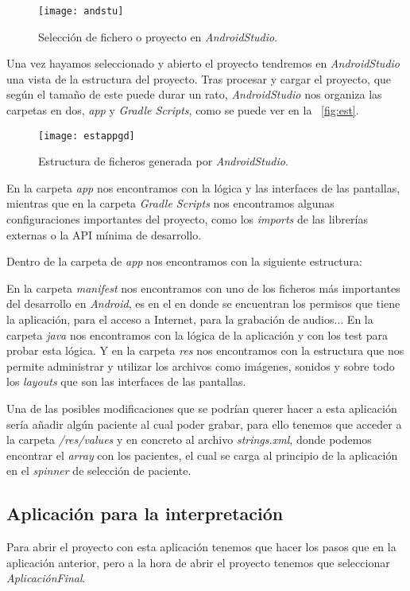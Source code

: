 \begin{figure}
	\centering
	\texttt{[image: andstu]}
	\caption{Selección de fichero o proyecto en \textit{AndroidStudio}.}
	\label{fig:andstu}
\end{figure}

Una vez hayamos seleccionado y abierto el proyecto tendremos en \textit{AndroidStudio} una vista de la estructura del proyecto. Tras procesar y cargar el proyecto, que según el tamaño de este puede durar un rato, \textit{AndroidStudio} nos organiza las carpetas en dos, \textit{app} y \textit{Gradle Scripts}, como se puede ver en la ~\ref{fig:est}.

\begin{figure}
	\centering
	\texttt{[image: estappgd]}
	\caption{Estructura de ficheros generada por \textit{AndroidStudio}.}
	\label{fig:estappgd}
\end{figure}

En la carpeta \textit{app} nos encontramos con la lógica y las interfaces de las pantallas, mientras que en la carpeta \textit{Gradle Scripts} nos encontramos algunas configuraciones importantes del proyecto, como los \textit{imports} de las librerías externas o la API mínima de desarrollo.

Dentro de la carpeta de \textit{app} nos encontramos con la siguiente estructura:

En la carpeta \textit{manifest} nos encontramos con uno de los ficheros más importantes del desarrollo en \textit{Android}, es en el en donde se encuentran los permisos que tiene la aplicación, para el acceso a Internet, para la grabación de audios... En la carpeta \textit{java} nos encontramos con la lógica de la aplicación y con los test para probar esta lógica. Y en la carpeta \textit{res} nos encontramos con la estructura que nos permite administrar y utilizar los archivos como imágenes, sonidos y sobre todo los \textit{layouts} que son las interfaces de las pantallas.

Una de las posibles modificaciones que se podrían querer hacer a esta aplicación sería añadir algún paciente al cual poder grabar, para ello tenemos que acceder a la carpeta \textit{/res/values} y en concreto al archivo \textit{strings.xml}, donde podemos encontrar el \textit{array} con los pacientes, el cual se carga al principio de la aplicación en el \textit{spinner} de selección de paciente.

\subsection{Aplicación para la interpretación}
Para abrir el proyecto con esta aplicación tenemos que hacer los pasos que en la aplicación anterior, pero a la hora de abrir el proyecto tenemos que seleccionar \textit{AplicaciónFinal}.

